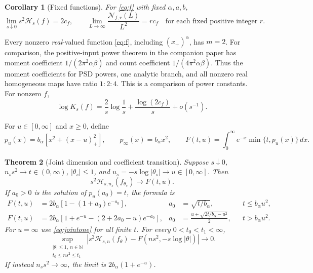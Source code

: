 \documentclass[11pt]{article}
\newtheorem{theorem}{Theorem}[section]
\newtheorem{corollary}[theorem]{Corollary}
\numberwithin{equation}{section}
\newcommand{\cH}{\mathcal H}
\newcommand{\cN}{\mathcal N}
\begin{document}
\begin{corollary}[Fixed functions]\label{thm:main}
For \eqref{eq:f} with fixed $\alpha,a,b$,
\begin{equation}\label{eq:main}
 \lim_{s\downarrow0}s^2\cH_s(f)=2c_f,\qquad
 \lim_{L\to\infty}\frac{\cN_{f,r}(L)}{L^2}=r c_f
 \quad\text{for each fixed positive integer }r.
\end{equation}
\end{corollary}

Every nonzero \emph{real}-valued function \eqref{eq:f}, including
$(x_+)^\alpha$, has $m=2$. For comparison, the
positive-input power theorem in the companion paper \cite{Companion}
has moment coefficient $1/(2\pi^2\alpha\beta)$ and count coefficient
$1/(4\pi^2\alpha\beta)$. Thus the moment coefficients for PSD powers,
one analytic branch, and all nonzero real homogeneous maps have ratio
$1:2:4$. This is a comparison of power constants. For nonzero $f$,
\begin{equation}\label{eq:K}
 \log K_s(f)=\frac2s\log\frac1s+\frac{\log(2c_f)}s+o(s^{-1}).
\end{equation}

For $u\in[0,\infty]$ and $x\ge0$, define
\begin{equation}\label{eq:pu}
 p_u(x)=b_\alpha[x^2+(x-u)_+^2],\qquad
 p_\infty(x)=b_\alpha x^2,\qquad
 F(t,u)=\int_0^\infty e^{-x}\min\{t,p_u(x)\}\,dx.
\end{equation}

\begin{theorem}[Joint dimension and coefficient transition]\label{thm:joint}
Suppose $s\downarrow0$, $n_s s^2\to t\in(0,\infty)$,
$|\theta_s|\le1$, and $u_s=-s\log|\theta_s|\to u\in[0,\infty]$.
Then
\begin{equation}\label{eq:joint}
 s^2\cH_{s,n_s}(f_{\theta_s})\longrightarrow F(t,u).
\end{equation}
If $a_0>0$ is the solution of $p_u(a_0)=t$, the formula is
\begin{align}
 F(t,u)&=2b_\alpha[1-(1+a_0)e^{-a_0}],
 &a_0&=\sqrt{t/b_\alpha}, && t\le b_\alpha u^2,\label{eq:jointone}\\
 F(t,u)&=2b_\alpha[1+e^{-u}-(2+2a_0-u)e^{-a_0}],
 &a_0&=\frac{u+\sqrt{2t/b_\alpha-u^2}}2,
 &&t>b_\alpha u^2.\label{eq:jointtwo}
\end{align}
For $u=\infty$ use \eqref{eq:jointone} for all finite $t$.
For every $0<t_0<t_1<\infty$,
\begin{equation}\label{eq:jointuniform}
 \sup_{\substack{|\theta|\le1,\ n\in\mathbb N\\t_0\le n s^2\le t_1}}
 \left|s^2\cH_{s,n}(f_\theta)
          -F(n s^2,-s\log|\theta|)\right|\longrightarrow0.
\end{equation}
If instead $n_s s^2\to\infty$, the limit is
$2b_\alpha(1+e^{-u})$.
\end{theorem}
\end{document}
